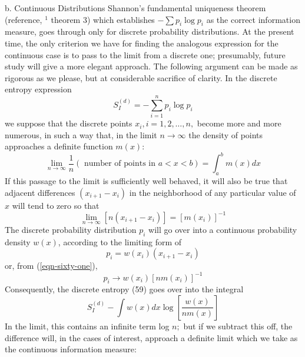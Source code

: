 \documentclass[]{article}
\begin{document}
b. Continuous Distributions
Shannon's fundamental uniqueness theorem (reference, $^{1}$ theorem 3) which establishes $-\sum p_{i} \log p_{i}$ as the correct information measure, goes through only for discrete probability distributions. At the present time, the only criterion we have for finding the analogous expression for the continuous case is to pass to the limit from a discrete one; presumably, future study will give a more elegant approach. The following argument can be made as rigorous as we please, but at considerable sacrifice of clarity. In the discrete entropy expression
\begin{equation}
S _{ I }^{( d )}=-\sum_{ i =1}^{n} p _{ i } \log p _{ i }
\end{equation}
we suppose that the discrete points $x_{i}, i=1,2, \ldots, n,$ become more and more numerous, in such a way that, in the limit $n \rightarrow \infty$ the density of points approaches a definite function $m ( x ):$
\begin{equation}
\lim _{n \rightarrow \infty} \frac{1}{n}(\text { number of points in } a<x<b)=\int_{a}^{b} m(x) d x
\end{equation}
If this passage to the limit is sufficiently well behaved, it will also be true that adjacent differences $\left(x_{i+1}-x_{i}\right)$ in the neighborhood of any particular value of $x$ will tend to zero so that
\begin{equation}
\lim _{n \rightarrow \infty}\left[n\left(x_{i+1}-x_{i}\right)\right]=\left[m\left(x_{i}\right)\right]^{-1} \label{eqn-sixty-one}
\end{equation}
The discrete probability distribution $p _{ i }$ will go over into a continuous probability density $w(x)$, according to the limiting form of
\begin{equation}
p_{i}=w\left(x_{i}\right)\left(x_{i+1}-x_{i}\right) \nonumber
\end{equation}
or, from (\ref{eqn-sixty-one}),
\begin{equation}
p _{ i } \rightarrow w \left( x _{ i }\right)\left[ nm \left( x _{ i }\right)\right]^{-1}
\end{equation}
Consequently, the discrete entropy (59) goes over into the integral
\begin{equation}
S _{ I }^{( d )}-\int w ( x ) dx \log \left[\frac{ w ( x )}{ nm ( x )}\right] \nonumber
\end{equation}
In the limit, this contains an infinite term log $n ;$ but if we subtract this off, the difference will, in the cases of interest, approach a definite limit which we take as the continuous information measure:
\end{document}
